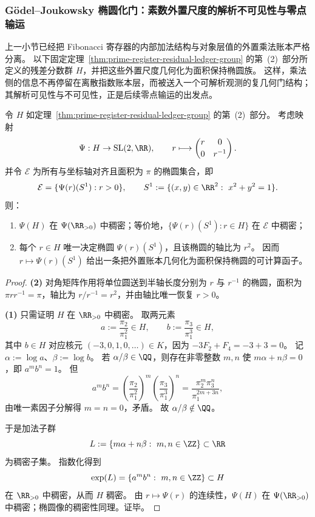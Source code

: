 \subsubsection{Gödel--Joukowsky 椭圆化门：素数外置尺度的解析不可见性与零点输运}\label{subsec:prime-register-godel-joukowsky}

上一小节已经把 Fibonacci 寄存器的内部加法结构与对象层值的外置乘法账本严格分离。
以下固定定理~\ref{thm:prime-register-residual-ledger-group} 的第~(2)~部分所定义的残差分数群 \(H\)，并把这些外置尺度几何化为面积保持椭圆族。
这样，乘法侧的信息不再停留在离散指数账本层，而被送入一个可解析观测的复几何门结构；其解析可见性与不可见性，正是后续零点输运的出发点。

\begin{theorem}[值保持算法群的稠密椭圆化]\label{thm:prime-register-dense-ellipticization}
令 \(H\) 如定理~\ref{thm:prime-register-residual-ledger-group} 的第~(2)~部分。
考虑映射
\[
\Psi: H\to \mathrm{SL}(2,\RR),\qquad r\longmapsto
\begin{pmatrix}
r & 0\\[2pt]
0 & r^{-1}
\end{pmatrix}.
\]
并令 \(\mathcal E\) 为所有与坐标轴对齐且面积为 \(\pi\) 的椭圆集合，即
\[
\mathcal E=\{\Psi(r)(S^1): r>0\},
\qquad
S^1:=\{(x,y)\in\RR^2:\ x^2+y^2=1\}.
\]
则：
\begin{enumerate}
  \item \(\Psi(H)\) 在 \(\Psi(\RR_{>0})\) 中稠密；等价地，\(\{\Psi(r)(S^1):r\in H\}\) 在 \(\mathcal E\) 中稠密；
  \item 每个 \(r\in H\) 唯一决定椭圆 \(\Psi(r)(S^1)\)，且该椭圆的轴比为 \(r^2\)。
  因而 \(r\mapsto \Psi(r)(S^1)\) 给出一条把外置账本几何化为面积保持椭圆的可计算函子。
\end{enumerate}
\end{theorem}

\begin{proof}
\textbf{(2)} 对角矩阵作用将单位圆送到半轴长度分别为 \(r\) 与 \(r^{-1}\) 的椭圆，面积为 \(\pi rr^{-1}=\pi\)，轴比为 \(r/r^{-1}=r^2\)，并由轴比唯一恢复 \(r>0\)。

\textbf{(1)} 只需证明 \(H\) 在 \(\RR_{>0}\) 中稠密。
取两元素
\[
a:=\frac{\pi_2}{\pi_1^2}\in H,
\qquad
b:=\frac{\pi_3}{\pi_1^3}\in H,
\]
其中 \(b\in H\) 对应核元 \((-3,0,1,0,\dots)\in K\)，因为 \(-3F_2+F_4=-3+3=0\)。
记 \(\alpha:=\log a\)、\(\beta:=\log b\)。
若 \(\alpha/\beta\in\QQ\)，则存在非零整数 \(m,n\) 使 \(m\alpha+n\beta=0\)，即 \(a^m b^n=1\)。
但
\[
a^m b^n
=\left(\frac{\pi_2}{\pi_1^2}\right)^m\left(\frac{\pi_3}{\pi_1^3}\right)^n
=\frac{\pi_2^m\pi_3^n}{\pi_1^{2m+3n}},
\]
由唯一素因子分解得 \(m=n=0\)，矛盾。
故 \(\alpha/\beta\notin\QQ\)。

于是加法子群
\[
L:=\{m\alpha+n\beta:\ m,n\in\ZZ\}\subset\RR
\]
为稠密子集。
指数化得到
\[
\exp(L)=\{a^m b^n:\ m,n\in\ZZ\}\subset H
\]
在 \(\RR_{>0}\) 中稠密，从而 \(H\) 稠密。
由 \(r\mapsto \Psi(r)\) 的连续性，\(\Psi(H)\) 在 \(\Psi(\RR_{>0})\) 中稠密；椭圆像的稠密性同理。证毕。
\end{proof}

